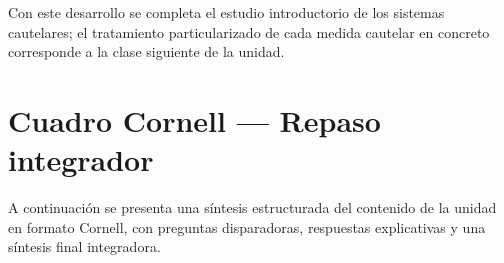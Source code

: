 \documentclass[12pt,oneside]{book}
\begin{document}
Con este desarrollo se completa el estudio introductorio de los sistemas cautelares; el tratamiento particularizado de cada medida cautelar en concreto corresponde a la clase siguiente de la unidad.

\chapter{Cuadro Cornell --- Repaso integrador}

A continuación se presenta una síntesis estructurada del contenido de la unidad en formato Cornell, con preguntas disparadoras, respuestas explicativas y una síntesis final integradora.
\end{document}
